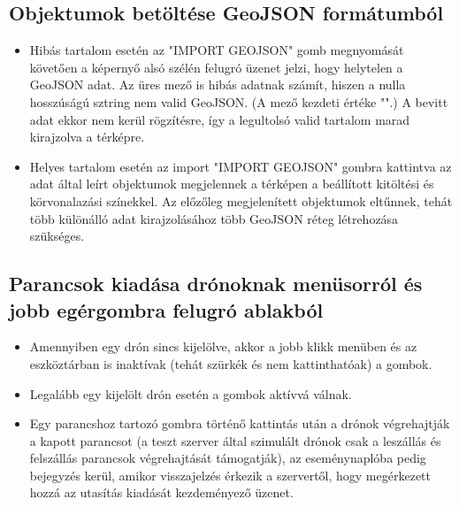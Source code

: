 \subsection{Objektumok betöltése GeoJSON formátumból}

\begin{itemize}

  \item Hibás tartalom esetén az "IMPORT GEOJSON" gomb megnyomását követően a
  képernyő alsó szélén felugró üzenet jelzi, hogy helytelen a GeoJSON adat. Az
  üres mező is hibás adatnak számít, hiszen a nulla hosszúságú sztring nem valid
  GeoJSON. (A mező kezdeti értéke "{}".) A bevitt adat ekkor nem kerül
  rögzítésre, így a legultolsó valid tartalom marad kirajzolva a térképre.

  \item Helyes tartalom esetén az import "IMPORT GEOJSON" gombra kattintva az
  adat által leírt objektumok megjelennek a térképen a beállított kitöltési és
  körvonalazási színekkel. Az előzőleg megjelenített objektumok eltűnnek, tehát
  több különálló adat kirajzolásához több GeoJSON réteg létrehozása szükséges.

\end{itemize}


\subsection{Parancsok kiadása drónoknak menüsorról és jobb egérgombra felugró ablakból}

\begin{itemize}

  \item Amennyiben egy drón sincs kijelölve, akkor a jobb klikk menüben és az
  eszköztárban is inaktívak (tehát szürkék és nem kattinthatóak) a gombok.

  \item Legalább egy kijelölt drón esetén a gombok aktívvá válnak.

  \item Egy parancshoz tartozó gombra történő kattintás után a drónok
  végrehajtják a kapott parancsot (a teszt szerver által szimulált drónok csak a
  leszállás és felszállás parancsok végrehajtását támogatják), az eseménynaplóba
  pedig bejegyzés kerül, amikor visszajelzés érkezik a szervertől, hogy
  megérkezett hozzá az utasítás kiadását kezdeményező üzenet.

\end{itemize}


